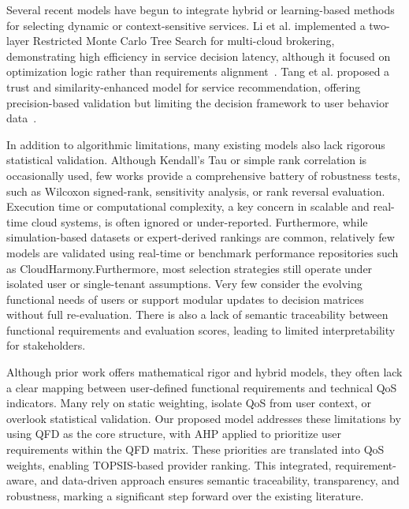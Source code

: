 \documentclass[twocolumn]{svjour3}
\begin{document}
Several recent models have begun to integrate hybrid or learning-based methods for selecting dynamic or context-sensitive services. Li et al. implemented a two-layer Restricted Monte Carlo Tree Search for multi-cloud brokering, demonstrating high efficiency in service decision latency, although it focused on optimization logic rather than requirements alignment~\cite{li2023multi}. Tang et al. proposed a trust and similarity-enhanced model for service recommendation, offering precision-based validation but limiting the decision framework to user behavior data~\cite{tang2024two}. 



In addition to algorithmic limitations, many existing models also lack rigorous statistical validation. Although Kendall's Tau or simple rank correlation is occasionally used, few works provide a comprehensive battery of robustness tests, such as Wilcoxon signed-rank, sensitivity analysis, or rank reversal evaluation. Execution time or computational complexity, a key concern in scalable and real-time cloud systems, is often ignored or under-reported. Furthermore, while simulation-based datasets or expert-derived rankings are common, relatively few models are validated using real-time or benchmark performance repositories such as CloudHarmony.Furthermore, most selection strategies still operate under isolated user or single-tenant assumptions. Very few consider the evolving functional needs of users or support modular updates to decision matrices without full re-evaluation. There is also a lack of semantic traceability between functional requirements and evaluation scores, leading to limited interpretability for stakeholders.

Although prior work offers mathematical rigor and hybrid models, they often lack a clear mapping between user-defined functional requirements and technical QoS indicators. Many rely on static weighting, isolate QoS from user context, or overlook statistical validation. Our proposed model addresses these limitations by using QFD as the core structure, with AHP applied to prioritize user requirements within the QFD matrix. These priorities are translated into QoS weights, enabling TOPSIS-based provider ranking. This integrated, requirement-aware, and data-driven approach ensures semantic traceability, transparency, and robustness, marking a significant step forward over the existing literature.
\end{document}
